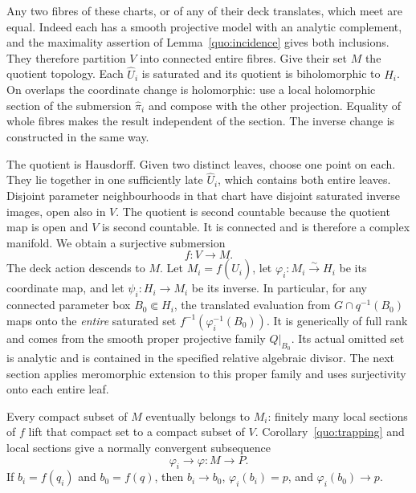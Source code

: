 Any two fibres of these charts, or of any of their deck translates,
which meet are equal. Indeed each has a smooth projective model
with an analytic complement, and the maximality assertion of
Lemma~\ref{quo:incidence} gives both inclusions. They therefore
partition \(V\) into connected entire fibres. Give their set
\(M\) the quotient topology. Each \(\widehat U_i\) is saturated
and its quotient is biholomorphic to \(H_i\). On overlaps the
coordinate change is holomorphic: use a local holomorphic
section of the submersion \(\widehat\pi_i\) and compose with
the other projection. Equality of whole fibres makes the result
independent of the section. The inverse change is constructed
in the same way.

The quotient is Hausdorff. Given two distinct leaves, choose one
point on each. They lie together in one sufficiently late
\(\widehat U_i\), which contains both entire leaves. Disjoint
parameter neighbourhoods in that chart have disjoint saturated
inverse images, open also in \(V\). The quotient is second
countable because the quotient map is open and \(V\) is second
countable. It is connected and is therefore a complex manifold.
We obtain a surjective submersion
\[
 f:V\longrightarrow M.
\]
The deck action descends to \(M\).
Let \(M_i=f(\widehat U_i)\), let
\(\varphi_i:M_i\xrightarrow{\sim}H_i\) be its coordinate map,
and let \(\psi_i:H_i\to M_i\) be its inverse.
In particular, for any connected parameter box \(B_0\Subset H_i\),
the translated evaluation from \(G\cap q^{-1}(B_0)\) maps onto
the \emph{entire} saturated set \(f^{-1}(\varphi_i^{-1}(B_0))\).
It is generically of full rank and comes from the smooth proper
projective family \(Q|_{B_0}\). Its actual omitted set is analytic
and is contained in the specified relative algebraic divisor.
The next section applies meromorphic extension to this proper
family and uses surjectivity onto each entire leaf.

Every compact subset of \(M\) eventually belongs to \(M_i\): finitely many
local sections of \(f\) lift that compact set to a compact
subset of \(V\). Corollary~\ref{quo:trapping} and local sections
give a normally convergent subsequence
\[
 \varphi_i\longrightarrow\varphi:M\longrightarrow P.
\]
If \(b_i=f(q_i)\) and \(b_0=f(q)\), then
\(b_i\to b_0\), \(\varphi_i(b_i)=p\), and
\(\varphi_i(b_0)\to p\).

